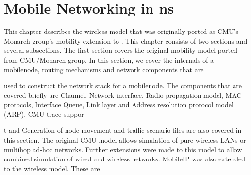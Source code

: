 %
\chapter{Mobile Networking in ns}
\label{chap:mobility}

This chapter describes the wireless model that was originally ported as CMU's Monarch group's mobility extension to \ns. 
This chapter consists of two sections and several subsections. The first section covers the original mobility model ported from CMU/Monarch group. In this section, we cover the internals of a mobilenode, routing mechanisms and network components that are 






















used to construct the network stack for a mobilenode. The components that are covered briefly are Channel, Network-interface, Radio propagation model, MAC protocols, Interface Queue, Link layer and Address resolution protocol model (ARP). CMU trace suppor






















t and Generation of node movement and traffic scenario files are also covered in this section.
The original CMU model allows simulation of pure wireless LANs or multihop ad-hoc networks. Further extensions were made to this model to allow combined simulation of wired and wireless networks. MobileIP was also extended to the wireless model. These are






















